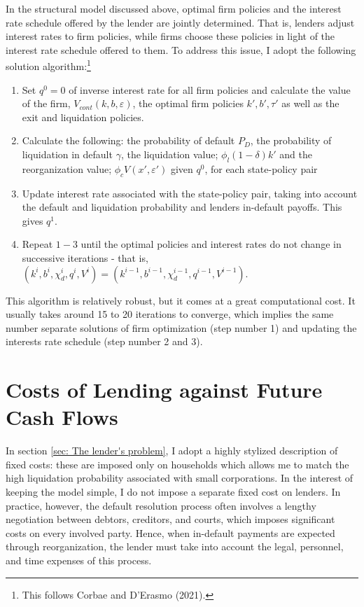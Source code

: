 \documentclass[12pt]{article}
\begin{document}
In the structural model discussed above, optimal firm policies and the interest rate schedule offered by the lender are jointly determined. That is, lenders adjust interest rates to firm policies, while firms choose these policies in light of the interest rate schedule offered to them. To address this issue, I adopt the following solution algorithm:\footnote{This follows Corbae and D'Erasmo (2021).}
\begin{enumerate}
    \item Set $q^0 = 0$ of inverse interest rate for all firm policies and calculate the value of the firm, $V_{cont}(k,b,\varepsilon)$, the optimal firm policies $k', b', \tau'$ as well as the exit and liquidation policies. 
    \item Calculate the following: the probability of default $P_D$, the probability of liquidation in default $\gamma$, the liquidation value; $\phi_l (1-\delta) k'$ and the reorganization value; $\phi_c V (x', \varepsilon')$ given $q^0$, for each state-policy pair
    \item Update interest rate associated with the state-policy pair, taking into account the default and liquidation probability and lenders in-default payoffs. This gives $q^1$. 
    \item Repeat $1-3$ until the optimal policies and interest rates do not change in successive iterations - that is, $ (k^{i},b^{i},\chi_d^{i},q^{i}, V^{i}) = (k^{i-1},b^{i-1},\chi_d^{i-1}, q^{i-1}, V^{i-1}) $.
\end{enumerate}
This algorithm is relatively robust, but it comes at a great computational cost. It usually takes around 15 to 20 iterations to converge, which implies the same number separate solutions of firm optimization (step number 1) and updating the interests rate schedule (step number 2 and 3). 

\section{Costs of Lending against Future Cash Flows \label{sec:fixed costs}}
In section \ref{sec: The lender's problem}, I adopt a highly stylized description of fixed costs: these are imposed only on households which allows me to match the high liquidation probability associated with small corporations. In the interest of keeping the model simple, I do not impose a separate fixed cost on lenders. In practice, however, the default resolution process often involves a lengthy negotiation between debtors, creditors, and courts, which imposes significant costs on every involved party. Hence, when in-default payments are expected through reorganization, the lender must take into account the legal, personnel, and time expenses of this process. 
\end{document}
